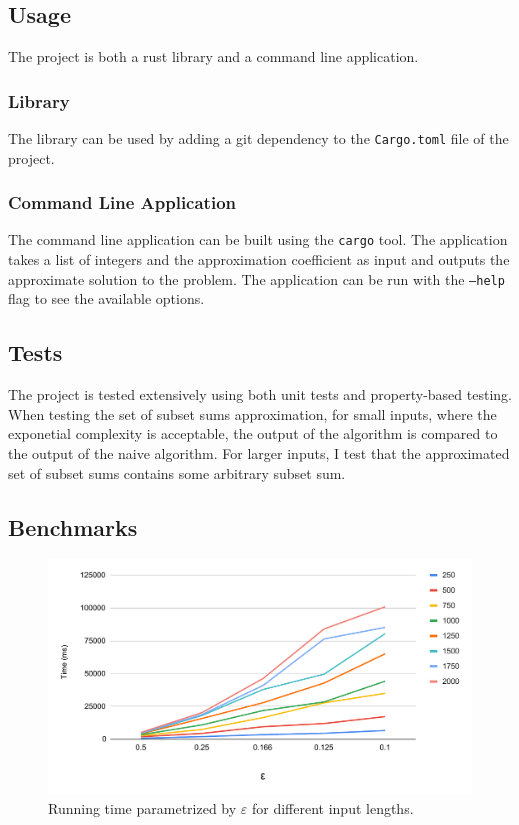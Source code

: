 \subsection{Usage}
The project is both a rust library and a command line application. 
\subsubsection{Library}
The library can be used by adding a git dependency to the \texttt{Cargo.toml} file of the project.
\subsubsection{Command Line Application}
The command line application can be built using the \texttt{cargo} tool. The application takes a list of integers and the approximation coefficient as input and outputs the approximate solution to the \Partition problem. The application can be run with the \texttt{--help} flag to see the available options.

\subsection{Tests}
The project is tested extensively using both unit tests and property-based testing. When testing the set of subset sums approximation, for small inputs, where the exponetial complexity is acceptable, the output of the algorithm is compared to the output of the naive algorithm. For larger inputs, I test that the approximated set of subset sums contains some arbitrary subset sum.

\subsection{Benchmarks}
\begin{figure}[h!]
    \centering
    \includegraphics[width=\linewidth]{charts/epsilon.pdf}
    \caption{Running time parametrized by $\varepsilon$ for different input lengths.}
    \label{fig:chart}
\end{figure}

